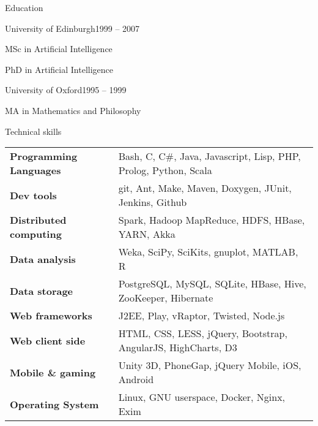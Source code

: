 \documentclass{resume} %
\begin{document}

\begin{rSection}{Education}
\begin{rSubsection}{University of Edinburgh}{1999 -- 2007}{}{}
\item MSc in Artificial Intelligence
\item PhD in Artificial Intelligence
\end{rSubsection}

\begin{rSubsection}{University of Oxford}{1995 -- 1999}{}{}
\item MA in Mathematics and Philosophy
\end{rSubsection}
\end{rSection}


\begin{rSection}{Technical skills}

\begin{tabular}{ @{} >{\bfseries}l @{\hspace{6ex}} l }
Programming Languages & Bash, C, C\#, Java, Javascript, Lisp, PHP, Prolog, Python, Scala \\
Dev tools & git, Ant, Make, Maven, Doxygen, JUnit, Jenkins, Github \\
Distributed computing & Spark, Hadoop MapReduce, HDFS, HBase, YARN, Akka \\
Data analysis & Weka, SciPy, SciKits, gnuplot, MATLAB, R \\
Data storage & PostgreSQL, MySQL, SQLite, HBase, Hive, ZooKeeper, Hibernate	\\
Web frameworks & J2EE, Play, vRaptor, Twisted, Node.js \\
Web client side & HTML, CSS, LESS, jQuery, Bootstrap, AngularJS, HighCharts, D3 \\
Mobile \& gaming & Unity 3D, PhoneGap, jQuery Mobile, iOS, Android \\
Operating System & Linux, GNU userspace, Docker, Nginx, Exim \\
\end{tabular}

\end{rSection}
\end{document}
